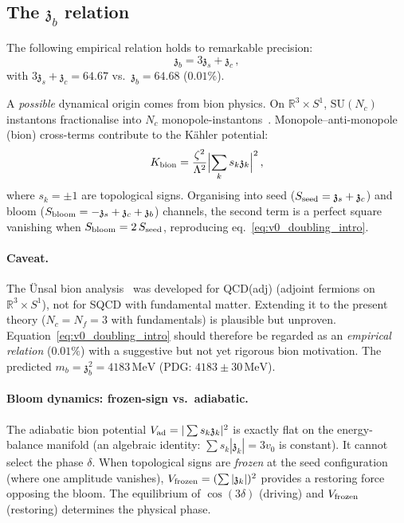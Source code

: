 \documentclass[aps,prd,twocolumn,showpacs,preprintnumbers,superscriptaddress,floatfix]{revtex4-2}
\newcommand{\SU}{\mathrm{SU}}
\newcommand{\Nf}{N_{\!f}}
\newcommand{\Nc}{N_{\!c}}
\newcommand{\MeV}{\,\mathrm{MeV}}
\newcommand{\zch}{\mathfrak{z}}
\begin{document}
\subsection{The $\zch_b$ relation}

The following empirical relation holds to remarkable precision:
\begin{equation}
  \boxed{\zch_b = 3\zch_s + \zch_c\,,}
  \label{eq:v0_doubling_intro}
\end{equation}
with $3\zch_s + \zch_c = 64.67$ vs.\ $\zch_b = 64.68$
($0.01\%$).

A \emph{possible} dynamical origin comes from bion physics.
On $\mathbb{R}^3 \times S^1$, $\SU(\Nc)$ instantons
fractionalise into $\Nc$
monopole-instantons~\cite{Unsal:2008}.
Monopole--anti-monopole (bion) cross-terms contribute to the
K\"ahler potential:
\begin{equation}
  K_{\rm bion} = \frac{\zeta^2}{\Lambda^2}
  \Bigl|\sum_k s_k \zch_k\Bigr|^2\,,
  \label{eq:Kbion}
\end{equation}
where $s_k = \pm 1$ are topological signs.
Organising into seed ($S_{\rm seed} = \zch_s + \zch_c$) and
bloom ($S_{\rm bloom} = -\zch_s + \zch_c + \zch_b$) channels,
the second term is a perfect square vanishing when
$S_{\rm bloom} = 2\,S_{\rm seed}$, reproducing
eq.~\eqref{eq:v0_doubling_intro}.

\paragraph{Caveat.}
The \"Unsal bion analysis~\cite{Unsal:2008} was developed for
QCD(adj) (adjoint fermions on $\mathbb{R}^3 \times S^1$), not
for SQCD with fundamental matter.
Extending it to the present theory ($\Nc = \Nf = 3$ with
fundamentals) is plausible but unproven.
Equation~\eqref{eq:v0_doubling_intro} should therefore be
regarded as an \emph{empirical relation} ($0.01\%$) with a
suggestive but not yet rigorous bion motivation.
The predicted $m_b = \zch_b^2 = 4183\MeV$
(PDG: $4183 \pm 30\MeV$).

\paragraph{Bloom dynamics: frozen-sign vs.\ adiabatic.}
The adiabatic bion potential
$V_{\rm ad} = |\sum s_k \zch_k|^2$ is exactly flat on the
energy-balance manifold (an algebraic identity: $\sum s_k
|\zch_k| = 3v_0$ is constant).
It cannot select the phase $\delta$.
When topological signs are \emph{frozen} at the seed
configuration (where one amplitude vanishes), $V_{\rm frozen}
= (\sum |\zch_k|)^2$ provides a restoring force opposing the
bloom.
The equilibrium of $\cos(3\delta)$ (driving) and
$V_{\rm frozen}$ (restoring) determines the physical phase.
\end{document}
